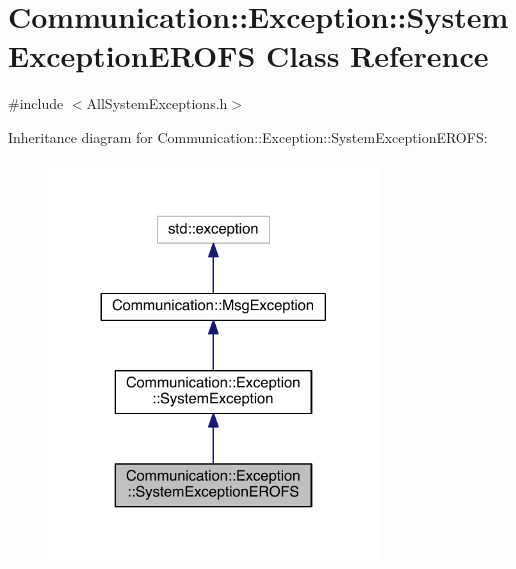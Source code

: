 \hypertarget{class_communication_1_1_exception_1_1_system_exception_e_r_o_f_s}{}\section{Communication\+:\+:Exception\+:\+:System\+Exception\+E\+R\+O\+F\+S Class Reference}
\label{class_communication_1_1_exception_1_1_system_exception_e_r_o_f_s}


{\ttfamily \#include $<$All\+System\+Exceptions.\+h$>$}



Inheritance diagram for Communication\+:\+:Exception\+:\+:System\+Exception\+E\+R\+O\+F\+S\+:\nopagebreak
\begin{figure}[H]
\begin{center}
\leavevmode
\includegraphics[width=248pt]{class_communication_1_1_exception_1_1_system_exception_e_r_o_f_s__inherit__graph}
\end{center}
\end{figure}


